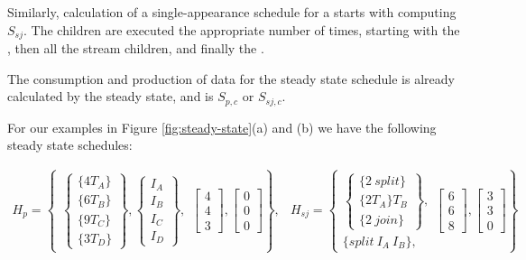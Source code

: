 Similarly, calculation of a single-appearance schedule for a
{\splitjoin} starts with computing $S_{sj}$. The children are
executed the appropriate number of times, starting with the
{\splitter}, then all the stream children, and finally the {\joiner}.

The consumption and production of data for the steady state
schedule is already calculated by the steady state, and is
$S_{p,c}$ or $S_{sj,c}$.

For our examples in Figure \ref{fig:steady-state}(a) and (b) we
have the following steady state schedules:

\begin{displaymath}
\begin{array}{lr}
H_p = \left\{\begin{array}{l}\left\{\begin{array}{c}\{4T_A\}\\
\{6T_B\} \\ \{9T_C\}\\ \{3T_D\}\end{array}\right\}, \left\{\begin{array}{c}I_A\\
I_B\\ I_C\\ I_D\end{array}\right\},\end{array} \left[
\begin{array}{c}
4\\4\\3
\end{array}\right], \left[
\begin{array}{c}
0\\0\\0
\end{array}\right] \right\}, &
H_{sj} = \left\{\begin{array}{c}\left\{\begin{array}{c}\{2\
split\}\\ \{2T_A\} T_B \\ \{2\ join\}\end{array}\right\},\\
\{split\ I_A\ I_B\}, \end{array}\left[
\begin{array}{c}
6\\6\\8
\end{array}\right], \left[
\begin{array}{c}
3\\3\\0
\end{array}\right] \right\}
\end{array}
\end{displaymath}

